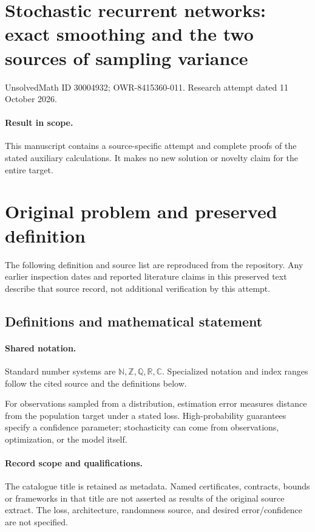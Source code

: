 \documentclass[11pt]{article}
\begin{document}
\section*{Stochastic recurrent networks: exact smoothing and the two sources of sampling variance}
\noindent UnsolvedMath ID 30004932; OWR-8415360-011. Research attempt dated 11 October 2026.
\paragraph{Result in scope.}This manuscript contains a source-specific attempt and complete proofs of the stated auxiliary calculations. It makes no new solution or novelty claim for the entire target.
\section{Original problem and preserved definition}
The following definition and source list are reproduced from the repository. Any earlier inspection dates and reported literature claims in this preserved text describe that source record, not additional verification by this attempt.
\subsection{Definitions and mathematical statement}

\paragraph{Shared notation.}Standard number systems are $\mathbb N,\mathbb Z,\mathbb Q,\mathbb R,\mathbb C$. Specialized notation and index ranges follow the cited source and the definitions below.


For observations sampled from a distribution, estimation error measures distance from the population target under a stated loss. High-probability guarantees specify a confidence parameter; stochasticity can come from observations, optimization, or the model itself.
\paragraph{Record scope and qualifications.}
The catalogue title is retained as metadata. Named certificates, contracts, bounds or frameworks in that title are not asserted as results of the original source extract.
The loss, architecture, randomness source, and desired error/confidence are not specified.
\end{document}
